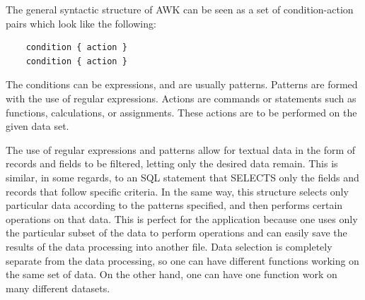 \documentclass[a4paper]{article}
\begin{document}
	The general syntactic structure of AWK can be seen as a set of condition-action pairs which look like the following:
	\begin{lstlisting}
	condition { action }
	condition { action }
	\end{lstlisting}
	The conditions can be expressions, and are usually patterns. Patterns are formed with the use of regular expressions. Actions are commands or statements such as functions, calculations, or assignments. These actions are to be performed on the given data set.
	
	The use of regular expressions and patterns allow for textual data in the form of records and fields to be filtered, letting only the desired data remain. This is similar, in some regards, to an SQL statement that SELECTS only the fields and records that follow specific criteria. In the same way, this structure selects only particular data according to the patterns specified, and then performs certain operations on that data. This is perfect for the application because one uses only the particular subset of the data to perform operations and can easily save the results of the data processing into another file. Data selection is completely separate from the data processing, so one can have different functions working on the same set of data. On the other hand, one can have one function work on many different datasets.

{}

	
\end{document}
